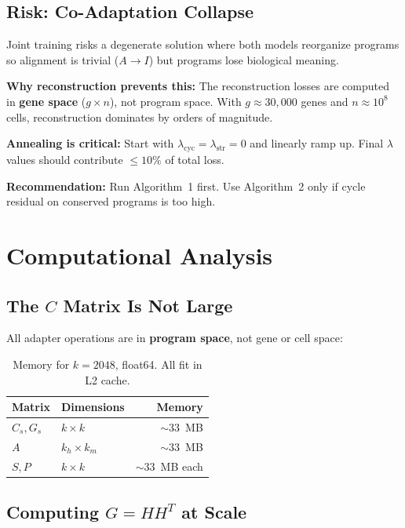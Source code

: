 \documentclass[10pt,twocolumn,letterpaper]{article}
\begin{document}
\subsection{Risk: Co-Adaptation Collapse}

Joint training risks a degenerate solution where both models reorganize
programs so alignment is trivial ($A \to I$) but programs lose biological
meaning.

\textbf{Why reconstruction prevents this:} The reconstruction losses are
computed in \textbf{gene space} ($g \times n$), not program space. With
$g \approx 30{,}000$ genes and $n \approx 10^8$ cells, reconstruction
dominates by orders of magnitude.

\textbf{Annealing is critical:} Start with $\lambda_{\text{cyc}} =
\lambda_{\text{str}} = 0$ and linearly ramp up. Final $\lambda$ values
should contribute $\leq 10\%$ of total loss.

\textbf{Recommendation:} Run Algorithm~1 first. Use Algorithm~2 only if
cycle residual on conserved programs is too high.

\section{Computational Analysis}

\subsection{The $C$ Matrix Is Not Large}

All adapter operations are in \textbf{program space}, not gene or cell space:

\begin{table}[h]
\centering\small
\begin{tabular}{@{}llr@{}}
\toprule
Matrix & Dimensions & Memory \\
\midrule
$C_s, G_s$ & $k \times k$ & ${\sim}33$~MB \\
$A$ & $k_h \times k_m$ & ${\sim}33$~MB \\
$S, P$ & $k \times k$ & ${\sim}33$~MB each \\
\bottomrule
\end{tabular}
\caption{Memory for $k = 2048$, float64. All fit in L2 cache.}
\end{table}

\subsection{Computing $G = HH^T$ at Scale}
\end{document}
